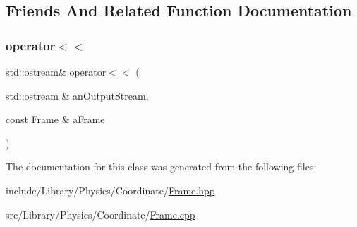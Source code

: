 \subsection{Friends And Related Function Documentation}
\mbox{\label{classlibrary_1_1physics_1_1coord_1_1_frame_a509ac1926cfc3553748bace204e2b1cc}} 
\subsubsection{\texorpdfstring{operator$<$$<$}{operator<<}}
{\footnotesize\ttfamily std\+::ostream\& operator$<$$<$ (\begin{DoxyParamCaption}\item[{std\+::ostream \&}]{an\+Output\+Stream,  }\item[{const \hyperlink{classlibrary_1_1physics_1_1coord_1_1_frame}{Frame} \&}]{a\+Frame }\end{DoxyParamCaption})\hspace{0.3cm}{\ttfamily [friend]}}



The documentation for this class was generated from the following files\+:\begin{DoxyCompactItemize}
\item 
include/\+Library/\+Physics/\+Coordinate/\hyperlink{_frame_8hpp}{Frame.\+hpp}\item 
src/\+Library/\+Physics/\+Coordinate/\hyperlink{_frame_8cpp}{Frame.\+cpp}\end{DoxyCompactItemize}
